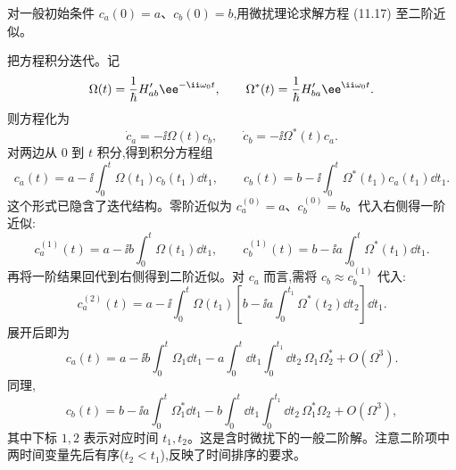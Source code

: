 \begin{question}
对一般初始条件 $c_a(0)=a$、$c_b(0)=b$,用微扰理论求解方程 (11.17) 至二阶近似。

\par\smallskip
{}

\end{question}
\begin{solution}
把方程积分迭代。记
\[
\Omega(t)={1\over\hbar}H'_{ab}\ee^{-\ii\omega_0t},
\qquad
\Omega^*(t)={1\over\hbar}H'_{ba}\ee^{\ii\omega_0t}.
\]
则方程化为
\[
\dot c_a=-\ii\Omega(t)c_b,\qquad
\dot c_b=-\ii\Omega^*(t)c_a.
\]
对两边从 $0$ 到 $t$ 积分,得到积分方程组
\[
c_a(t)=a-\ii\int_0^t\Omega(t_1)c_b(t_1)\dd t_1,
\qquad
c_b(t)=b-\ii\int_0^t\Omega^*(t_1)c_a(t_1)\dd t_1.
\]
这个形式已隐含了迭代结构。零阶近似为 $c_a^{(0)}=a$、$c_b^{(0)}=b$。代入右侧得一阶近似:
\[
c_a^{(1)}(t)=a-\ii b\int_0^t\Omega(t_1)\dd t_1,
\qquad
c_b^{(1)}(t)=b-\ii a\int_0^t\Omega^*(t_1)\dd t_1.
\]
再将一阶结果回代到右侧得到二阶近似。对 $c_a$ 而言,需将 $c_b\approx c_b^{(1)}$ 代入:
\[
c_a^{(2)}(t)=a-\ii\int_0^t\Omega(t_1)\left[b-\ii a\int_0^{t_1}\Omega^*(t_2)\dd t_2\right]\dd t_1.
\]
展开后即为
\[
c_a(t)=a-\ii b\int_0^t\Omega_1\dd t_1
-a\int_0^t\dd t_1\int_0^{t_1}\dd t_2\,\Omega_1\Omega_2^*+O(\Omega^3).
\]
同理,
\[
c_b(t)=b-\ii a\int_0^t\Omega_1^*\dd t_1
-b\int_0^t\dd t_1\int_0^{t_1}\dd t_2\,\Omega_1^*\Omega_2+O(\Omega^3),
\]
其中下标 $1,2$ 表示对应时间 $t_1,t_2$。这是含时微扰下的一般二阶解。注意二阶项中两时间变量先后有序($t_2<t_1$),反映了时间排序的要求。
\end{solution}

